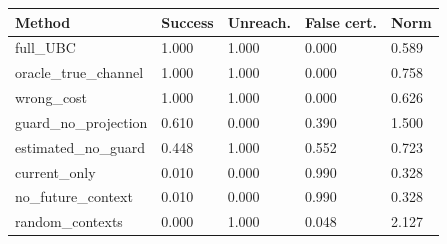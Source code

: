 \begin{tabular}{lllll}
\toprule
Method & Success & Unreach. & False cert. & Norm \\
\midrule
full\_UBC & 1.000 & 1.000 & 0.000 & 0.589 \\
oracle\_true\_channel & 1.000 & 1.000 & 0.000 & 0.758 \\
wrong\_cost & 1.000 & 1.000 & 0.000 & 0.626 \\
guard\_no\_projection & 0.610 & 0.000 & 0.390 & 1.500 \\
estimated\_no\_guard & 0.448 & 1.000 & 0.552 & 0.723 \\
current\_only & 0.010 & 0.000 & 0.990 & 0.328 \\
no\_future\_context & 0.010 & 0.000 & 0.990 & 0.328 \\
random\_contexts & 0.000 & 1.000 & 0.048 & 2.127 \\
\bottomrule
\end{tabular}
